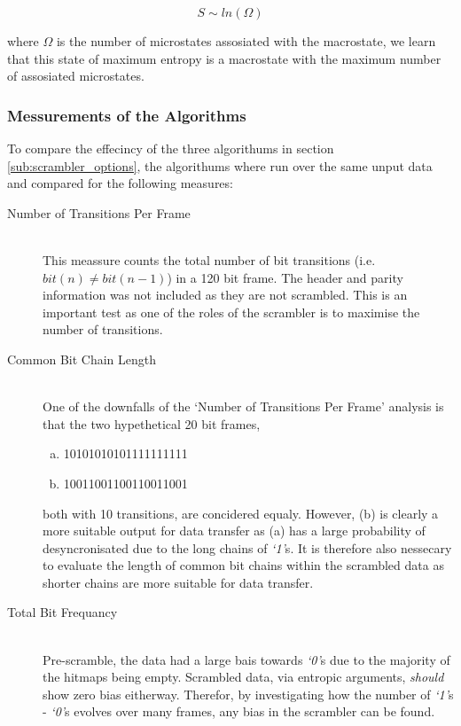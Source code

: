 		\begin{equation}
			S \sim ln(\Omega)
			\label{eqn:boltzman}
		\end{equation}

		where $\Omega$ is the number of microstates assosiated with the macrostate, we learn that this state of maximum entropy is a macrostate with the maximum number of assosiated microstates.

		\subsubsection{Messurements of the Algorithms} 
		\label{subsub:messurements_of_the_algorithms}

			To compare the effecincy of the three algorithums in section \ref{sub:scrambler_options}, the algorithums where run over the same unput data and compared for the following measures:

			\begin{description}
				\item[Number of Transitions Per Frame] \hfill \\
					This meassure counts the total number of bit transitions (i.e. $bit(n) \neq bit(n-1)$) in a 120 bit frame. 
					The header and parity information was not included as they are not scrambled.
					This is an important test as one of the roles of the scrambler is to maximise the number of transitions.

				\item[Common Bit Chain Length] \hfill \\
					One of the downfalls of the `Number of Transitions Per Frame' analysis is that the two hypethetical 20 bit frames,

					\begin{enumerate}[a)]
						\item \textsc{10101010101111111111}
						\item \textsc{10011001100110011001}
					\end{enumerate}

					both with 10 transitions, are concidered equaly. However, (b) is clearly a more suitable output for data transfer as (a) has a large probability of desyncronisated due to the long chains of \textit{`1'}s.
					It is therefore also nessecary to evaluate the length of common bit chains within the scrambled data as shorter chains are more suitable for data transfer.

				\item[Total Bit Frequancy] \hfill \\
					Pre-scramble, the data had a large bais towards \textit{`0'}s due to the majority of the hitmaps being empty.
					Scrambled data, via entropic arguments, \textit{should} show zero bias eitherway.
					Therefor, by investigating how the number of \textit{`1'}s - \textit{`0'}s evolves over many frames, any bias in the scrambler can be found.

			\end{description}	


